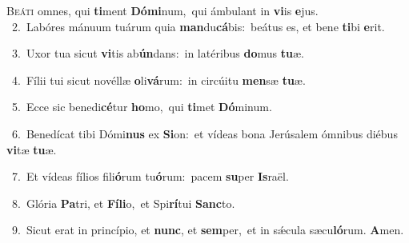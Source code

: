 \lettrine{\initial\textcolor{\initialcolor}{B}}{eáti} omnes, qui \textbf{ti}\-ment \textbf{Dó}\-\textbf{mi}num,~\star qui ámbulant in \textbf{vi}\-is \textbf{e}\-jus.\\
{\numbfont\textcolor{\numbcolor}{~2.}}~Labóres mánuum tuárum quia \textbf{man}\-du\-\textbf{cá}\-bis:~\star beátus es, et bene \textbf{ti}\-bi \textbf{e}\-rit.\par
{\numbfont\textcolor{\numbcolor}{~3.}}~Uxor tua sicut \textbf{vi}\-tis ab\-\textbf{ún}\-dans:~\star in latéribus \textbf{do}\-mus \textbf{tu}\-æ.\par
{\numbfont\textcolor{\numbcolor}{~4.}}~Fílii tui sicut novéllæ \textbf{o}\-li\-\textbf{vá}\-rum:~\star in circúitu \textbf{men}\-sæ \textbf{tu}\-æ.\par
{\numbfont\textcolor{\numbcolor}{~5.}}~Ecce sic benedi\-\textbf{cé}\-tur \textbf{ho}\-mo,~\star qui \textbf{ti}\-met \textbf{Dó}\-minum.\par
{\numbfont\textcolor{\numbcolor}{~6.}}~Benedícat tibi Dómi\textbf{nus} ex \textbf{Si}\-on:~\star et vídeas bona Jerúsalem ómnibus diébus \textbf{vi}\-tæ \textbf{tu}\-æ.\par
{\numbfont\textcolor{\numbcolor}{~7.}}~Et vídeas fílios fili\-\textbf{ó}\-rum tu\-\textbf{ó}\-rum:~\star pacem \textbf{su}\-per \textbf{Is}\-raël.\par
{\numbfont\textcolor{\numbcolor}{~8.}}~Glória \textbf{Pa}\-tri, et \textbf{Fí}\-\textbf{li}o,~\star et Spi\-\textbf{rí}\-tui \textbf{Sanc}\-to.\par
{\numbfont\textcolor{\numbcolor}{~9.}}~Sicut erat in princípio, et \textbf{nunc}\-, et \textbf{sem}\-per,~\star et in sǽcula sæcu\-\textbf{ló}\-rum. \textbf{A}\-men.\par
